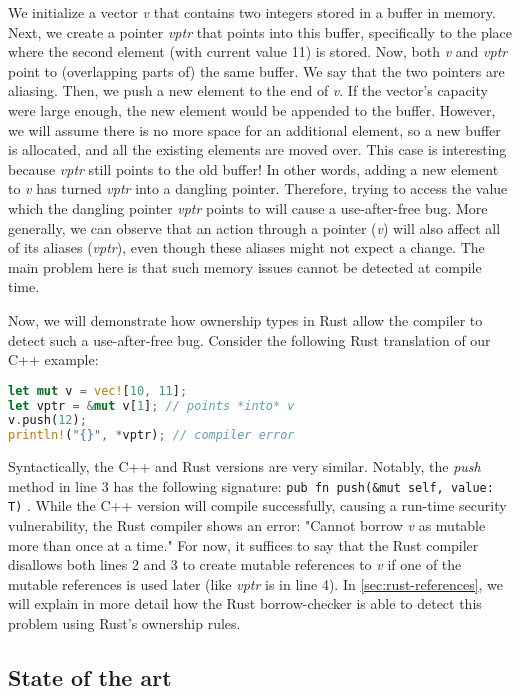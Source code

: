 \documentclass[sigplan,11pt,nonacm]{acmart}
\begin{document}
We initialize a vector \emph{v} that contains two integers stored in a buffer in memory.
Next, we create a pointer \emph{vptr} that points into this buffer, specifically to the place where the second element (with current value 11) is stored.
Now, both \emph{v} and \emph{vptr} point to (overlapping parts of) the same buffer.
We say that the two pointers are aliasing.
Then, we push a new element to the end of \emph{v}.
If the vector's capacity were large enough, the new element would be appended to the buffer.
However, we will assume there is no more space for an additional element, so a new buffer is allocated, and all the existing elements are moved over.
This case is interesting because \emph{vptr} still points to the old buffer!
In other words, adding a new element to \emph{v} has turned \emph{vptr} into a dangling pointer.
Therefore, trying to access the value which the dangling pointer \emph{vptr} points to will cause a use-after-free bug.
More generally, we can observe that an action through a pointer (\emph{v}) will also affect all of its aliases (\emph{vptr}), even though these aliases might not expect a change.
The main problem here is that such memory issues cannot be detected at compile time.

Now, we will demonstrate how ownership types in Rust allow the compiler to detect such a use-after-free bug.
Consider the following Rust translation of our C++ example:

\begin{lstlisting}[language=Rust]
let mut v = vec![10, 11];
let vptr = &mut v[1]; // points *into* v
v.push(12);
println!("{}", *vptr); // compiler error
\end{lstlisting}

Syntactically, the C++ and Rust versions are very similar.
Notably, the \emph{push} method in line 3 has the following signature: \verb|pub fn push(&mut self, value: T)| \cite{rust-vector-documentation}.
While the C++ version will compile successfully, causing a run-time security vulnerability, the Rust compiler shows an error: "Cannot borrow \emph{v} as mutable more than once at a time."
For now, it suffices to say that the Rust compiler disallows both lines 2 and 3 to create mutable references to \emph{v} if one of the mutable references is used later (like \emph{vptr} is in line 4).
In \ref{sec:rust-references}, we will explain in more detail how the Rust borrow-checker is able to detect this problem using Rust's ownership rules.


\subsection{State of the art}
\label{sec:state-of-the-art}
\end{document}
